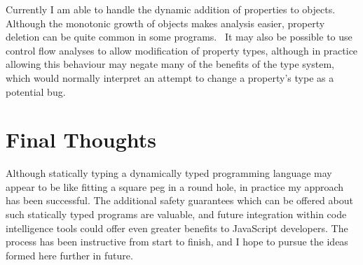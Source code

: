 \documentclass[12pt,a4paper,twoside,openright]{report}
\theoremstyle{definition}
\theoremstyle{dotless}
\begin{document}
Currently I am able to handle the dynamic addition of properties to objects. 
Although the monotonic growth of objects makes analysis easier, property deletion
can be quite common in some programs.~\cite{JSBehaviour} It may also be possible
to use control flow analyses to allow modification of property types, although
in practice allowing this behaviour may negate many of the benefits of the type system, which 
would normally interpret an attempt to change a property's type as a potential bug.

\section{Final Thoughts}

Although statically typing a dynamically typed programming language may appear
to be like fitting a square peg in a round hole, in practice my approach has
been successful. The additional safety guarantees which can be offered about
such statically typed programs are valuable, and future integration within code
intelligence tools could offer even greater benefits to JavaScript developers.
The process has been instructive from start to finish, and I hope to pursue the
ideas formed here further in future.

\printbibliography{}
\end{document}
